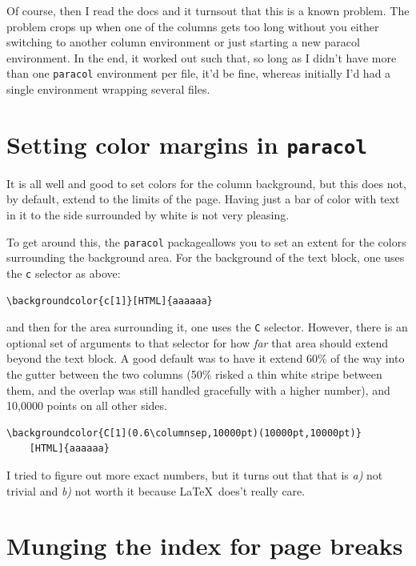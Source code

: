 \begin{paracol}{2}
\begin{leftcolumn}
Of course, then I read the docs and it turnsout that this is a known problem. The problem crops up when one of the columns gets too long without you either switching to another column environment or just starting a new paracol environment. In the end, it worked out such that, so long as I didn't have more than one \texttt{paracol} environment per file, it'd be fine, whereas initially I'd had a single environment wrapping several files.


\section*{Setting color margins in \texttt{paracol}}\label{color-margins}

It is all well and good to set colors for the column background, but this does not, by default, extend to the limits of the page. Having just a bar of color with text in it to the side surrounded by white is not very pleasing.

To get around this, the \texttt{paracol} packageallows you to set an extent for the colors surrounding the background area. For the background of the text block, one uses the \texttt{c} selector as above:

\begin{verbatim}
\backgroundcolor{c[1]}[HTML]{aaaaaa}
\end{verbatim}

and then for the area surrounding it, one uses the \texttt{C} selector. However, there is an optional set of arguments to that selector for how \emph{far} that area should extend beyond the text block.  A good default was to have it extend 60\% of the way into the gutter between the two columns (50\% risked a thin white stripe between them, and the overlap was still handled gracefully with a higher number), and 10,0000 points on all other sides.

\begin{verbatim}
\backgroundcolor{C[1](0.6\columnsep,10000pt)(10000pt,10000pt)}
	[HTML]{aaaaaa}
\end{verbatim}

I tried to figure out more exact numbers, but it turns out that that is \emph{a)} not trivial and \emph{b)} not worth it because \LaTeX\ does't really care.

\section*{Munging the index for page breaks}\label{indexmunge}


\end{leftcolumn}
\end{paracol}
